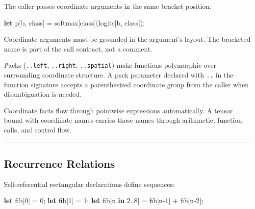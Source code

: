 \documentclass[11pt,]{article}
\newenvironment{Shaded}{}{}
\newcommand{\DecValTok}[1]{\textcolor[rgb]{0.25,0.63,0.44}{#1}}
\newcommand{\KeywordTok}[1]{\textcolor[rgb]{0.00,0.44,0.13}{\textbf{#1}}}
\newcommand{\NormalTok}[1]{#1}
\newcommand{\OperatorTok}[1]{\textcolor[rgb]{0.40,0.40,0.40}{#1}}
\begin{document}
The caller passes coordinate arguments in the same bracket position:

\begin{Shaded}
\begin{Highlighting}[]
\KeywordTok{let}\NormalTok{ p}\OperatorTok{[}\NormalTok{b, class}\OperatorTok{]}\NormalTok{ = softmax}\OperatorTok{[}\NormalTok{class}\OperatorTok{]}\NormalTok{(logits}\OperatorTok{[}\NormalTok{b, class}\OperatorTok{]}\NormalTok{);}
\end{Highlighting}
\end{Shaded}

Coordinate arguments must be grounded in the argument's layout. The
bracketed name is part of the call contract, not a comment.

Packs (\texttt{..left}, \texttt{..right}, \texttt{..spatial}) make
functions polymorphic over surrounding coordinate structure. A pack
parameter declared with \texttt{..} in the function signature accepts a
parenthesized coordinate group from the caller when disambiguation is
needed.

Coordinate facts flow through pointwise expressions automatically. A
tensor bound with coordinate names carries those names through
arithmetic, function calls, and control flow.

\begin{center}\rule{0.5\linewidth}{0.4pt}\end{center}

\hypertarget{recurrence-relations}{%
\subsection{Recurrence Relations}\label{recurrence-relations}}

Self-referential rectangular declarations define sequences:

\begin{Shaded}
\begin{Highlighting}[]
\KeywordTok{let}\NormalTok{ fib}\OperatorTok{[}\DecValTok{0}\OperatorTok{]}\NormalTok{ = }\DecValTok{0}\NormalTok{;}
\KeywordTok{let}\NormalTok{ fib}\OperatorTok{[}\DecValTok{1}\OperatorTok{]}\NormalTok{ = }\DecValTok{1}\NormalTok{;}
\KeywordTok{let}\NormalTok{ fib}\OperatorTok{[}\NormalTok{n }\KeywordTok{in} \DecValTok{2.}\NormalTok{.}\DecValTok{8}\OperatorTok{]}\NormalTok{ = fib}\OperatorTok{[}\NormalTok{n-}\DecValTok{1}\OperatorTok{]}\NormalTok{ + fib}\OperatorTok{[}\NormalTok{n-}\DecValTok{2}\OperatorTok{]}\NormalTok{;}
\end{Highlighting}
\end{Shaded}
\end{document}
